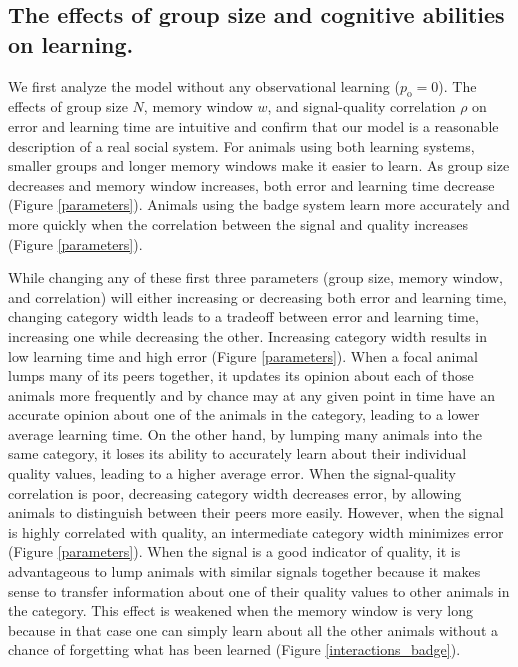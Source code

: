 \subsection*{The effects of group size and cognitive abilities on learning. }
We first analyze the model without any observational learning ($p_\text{o}=0$). The effects of group size $N$, memory window $w$, and signal-quality correlation $\rho$ on error and learning time are intuitive and confirm that our model is a reasonable description of a real social system. For animals using both learning systems, smaller groups and longer memory windows make it easier to learn. As group size decreases and memory window increases, both error and learning time decrease (Figure \ref{parameters}). Animals using the badge system learn more accurately and more quickly when the correlation between the signal and quality increases (Figure \ref{parameters}).

While changing any of these first three parameters (group size, memory window, and correlation) will either increasing or decreasing both error and learning time, changing category width leads to a tradeoff between error and learning time, increasing one while decreasing the other. Increasing category width results in low learning time and high error (Figure \ref{parameters}). When a focal animal lumps many of its peers together, it updates its opinion about each of those animals more frequently and by chance may at any given point in time have an accurate opinion about one of the animals in the category, leading to a lower average learning time. On the other hand, by lumping many animals into the same category, it loses its ability to accurately learn about their individual quality values, leading to a higher average error.  When the signal-quality correlation is poor, decreasing category width decreases error, by allowing animals to distinguish between their peers more easily. However, when the signal is highly correlated with quality, an intermediate category width minimizes error (Figure \ref{parameters}). When the signal is a good indicator of quality, it is advantageous to lump animals with similar signals together because it makes sense to transfer information about one of their quality values to other animals in the category. This effect is weakened when the memory window is very long because in that case one can simply learn about all the other animals without a chance of forgetting what has been learned (Figure \ref{interactions_badge}).

%
